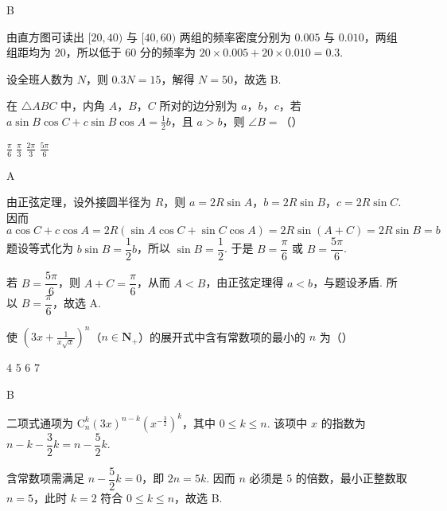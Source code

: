 \begin{answer}
B
\end{answer}

\begin{solution}
由直方图可读出 \([20,40)\) 与 \([40,60)\) 两组的频率密度分别为 \(0.005\) 与 \(0.010\)，两组组距均为 \(20\)，所以低于 \(60\) 分的频率为
\(20\times0.005+20\times0.010=0.3\).

设全班人数为 \(N\)，则 \(0.3N=15\)，解得 \(N=50\)，故选 B.
\end{solution}

\begin{problem}
在 \(\triangle ABC\) 中，内角 \(A\)，\(B\)，\(C\) 所对的边分别为 \(a\)，\(b\)，\(c\)，若 \(a \sin B \cos C + c \sin B \cos A = \frac{1}{2} b\)，且 \(a > b\)，则 \(\angle B =\)（\quad）

\choices
    {\(\frac{\pi}{6}\)}
    {\(\frac{\pi}{3}\)}
    {\(\frac{2\pi}{3}\)}
    {\(\frac{5\pi}{6}\)}
\end{problem}

\begin{answer}
A
\end{answer}

\begin{solution}
由正弦定理，设外接圆半径为 \(R\)，则 \(a=2R\sin A\)，\(b=2R\sin B\)，\(c=2R\sin C\). 因而
\[
a\cos C+c\cos A=2R(\sin A\cos C+\sin C\cos A)=2R\sin(A+C)=2R\sin B=b
\]
题设等式化为 \(b\sin B=\dfrac12b\)，所以 \(\sin B=\dfrac12\). 于是 \(B=\dfrac\pi6\) 或 \(B=\dfrac{5\pi}6\).

若 \(B=\dfrac{5\pi}6\)，则 \(A+C=\dfrac\pi6\)，从而 \(A<B\)，由正弦定理得 \(a<b\)，与题设矛盾. 所以 \(B=\dfrac\pi6\)，故选 A.
\end{solution}

\begin{problem}
使 \(\left(3x + \frac{1}{x\sqrt{x}}\right)^n\)（\(n \in \mathbf{N}_{+}\)）的展开式中含有常数项的最小的 \(n\) 为（\quad）

\choices
    {\(4\)}
    {\(5\)}
    {\(6\)}
    {\(7\)}
\end{problem}

\begin{answer}
B
\end{answer}

\begin{solution}
二项式通项为
\(\mathrm C_n^k(3x)^{n-k}\left(x^{-\frac{3}{2}}\right)^k\)，其中 \(0\leqslant k\leqslant n\). 该项中 \(x\) 的指数为
\(n-k-\dfrac32k=n-\dfrac52k\).

含常数项需满足 \(n-\dfrac52k=0\)，即 \(2n=5k\). 因而 \(n\) 必须是 \(5\) 的倍数，最小正整数取 \(n=5\)，此时 \(k=2\) 符合 \(0\leqslant k\leqslant n\)，故选 B.
\end{solution}

